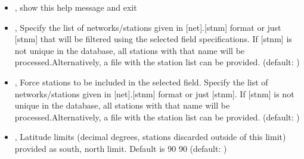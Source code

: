 \documentclass[letterpaper,10pt,english]{sphinxmanual}
\begin{document}
\label{\detokenize{com:TrajectoryFit.py-options}}\begin{itemize}
\item {} 
\sphinxAtStartPar
{\hyperref[\detokenize{com:TrajectoryFit.py--h}]{}}, {\hyperref[\detokenize{com:TrajectoryFit.py---help}]{}} \sphinxhyphen{} show this help message and exit

\item {} 
\sphinxAtStartPar
{\hyperref[\detokenize{com:TrajectoryFit.py--stn}]{}} , {\hyperref[\detokenize{com:TrajectoryFit.py---stations}]{}}  \sphinxhyphen{} Specify the list of networks/stations given in {[}net{]}.{[}stnm{]} format or just {[}stnm{]} that will be filtered using the selected field specifications. If {[}stnm{]} is not unique in the database, all stations with that name will be processed.Alternatively, a file with the station list can be provided. (default: \sphinxcode{\sphinxupquote{{[}{]}}})

\item {} 
\sphinxAtStartPar
{\hyperref[\detokenize{com:TrajectoryFit.py--force_stn}]{}} , {\hyperref[\detokenize{com:TrajectoryFit.py---force_stations}]{}}  \sphinxhyphen{} Force stations to be included in the selected field. Specify the list of networks/stations given in {[}net{]}.{[}stnm{]} format or just {[}stnm{]}. If {[}stnm{]} is not unique in the database, all stations with that name will be processed.Alternatively, a file with the station list can be provided. (default: \sphinxcode{\sphinxupquote{{[}{]}}})

\item {} 
\sphinxAtStartPar
{\hyperref[\detokenize{com:TrajectoryFit.py--lat_lim}]{}} , {\hyperref[\detokenize{com:TrajectoryFit.py---latitude_limits}]{}}  \sphinxhyphen{} Latitude limits (decimal degrees, stations discarded outside of this limit) provided as south, north limit. Default is \sphinxhyphen{}90 90 (default: \sphinxcode{\sphinxupquote{{[}\sphinxhyphen{}90, 90{]}}})


\end{itemize}
\end{document}
